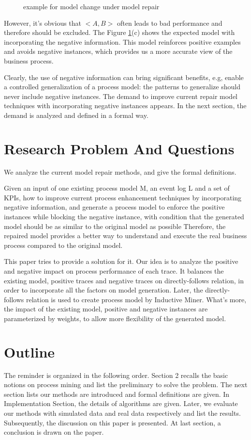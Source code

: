 \begin{figure}[h]
	\caption{example for model change under model repair}
	\label{fig:model_examples}
\end{figure}

However, it's obvious that $<A,B>$ often leads to bad performance and therefore should be excluded. The Figure \ref{fig:model_examples}(c) shows the expected model with incorporating the negative information. This model reinforces positive examples and avoids negative instances, which provides us a more accurate view of the business process.

Clearly, the use of negative information can bring significant benefits, e.g, enable a controlled generalization of a process model: the patterns to generalize should never include negative instances. The demand to improve current repair model techniques with incorporating negative instances appears. In the next section, the demand is analyzed and defined in a formal way.

\section{Research Problem And Questions}
We analyze the current model repair methods, and give the formal definitions.
\begin{definition}
Given an input of one existing process model M, an event log L and a set of KPIs, how  to improve current process enhancement techniques by incorporating negative information, and generate a process model to enforce the positive instances while blocking the negative instance, with condition that the generated model should be as similar to the original model as possible Therefore, the repaired model provides a better way to understand and execute the real business process compared to the original model.
\end{definition}


This paper tries to provide a solution for it. Our idea is to analyze the positive and negative impact on process performance of each trace. It balances the existing model, positive traces and negative traces on directly-follows relation, in order to incorporate all the factors on model generation. Later, the directly-follows relation is used to create process model by Inductive Miner. What's more, the impact of the existing model, positive and negative instances are parameterized by weights, to allow more flexibility of the generated model.

\section{Outline}
The reminder is organized in the following order. Section 2 recalls the basic notions on process mining and list the preliminary to solve the problem. The next section lists our methods are introduced and formal definitions are given. In Implementation Section, the details of algorithms are given. Later, we evaluate our methods with simulated data and real data respectively and list the results. Subsequently, the discussion on this paper is presented. At last section, a conclusion is drawn on the paper. 


%